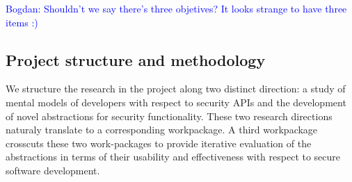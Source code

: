 \documentclass[10pt]{article}
\newcommand{\bw}[1]{{\textcolor{blue} {Bogdan: #1}}}
\begin{document}
\bw{Shouldn't we say there's three objetives?  It looks strange to have three items :)}


\subsection*{Project structure and methodology}


We structure the research in the project along two distinct direction: a study of mental models of developers with respect to security APIs and the development of novel abstractions for security functionality.  These two research directions naturaly translate to a corresponding workpackage. 
A third workpackage crosscuts these two work-packages to provide iterative evaluation of the abstractions in terms of their usability and effectiveness with respect to secure software development.
\end{document}
